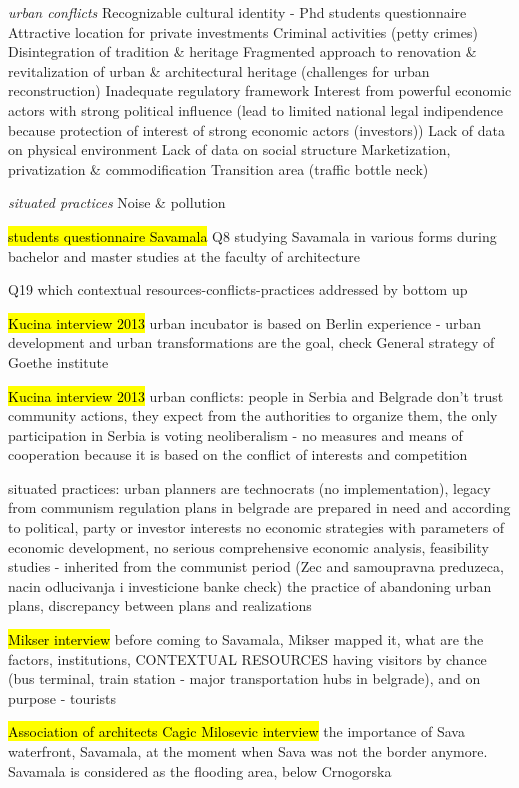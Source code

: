 \documentclass[11pt]{report}
\begin{document}
\textit{urban conflicts}
Recognizable cultural identity - Phd students questionnaire
Attractive location for private investments
Criminal activities (petty crimes)
Disintegration of tradition \& heritage
Fragmented approach to renovation \& revitalization of urban \& architectural heritage (challenges for urban reconstruction)
Inadequate regulatory framework
Interest from powerful economic actors with strong political
influence (lead to limited national legal indipendence because protection of interest of strong economic actors (investors))
Lack of data on physical environment
Lack of data on social structure
Marketization, privatization \& commodification
Transition area (traffic bottle neck)

\textit{situated practices}
Noise \& pollution

\hl{students questionnaire Savamala}
Q8
studying Savamala in various forms during bachelor and master studies at the faculty of architecture

Q19 which contextual resources-conflicts-practices addressed by bottom up

\hl{Kucina interview 2013}
urban incubator is based on Berlin experience - urban development and urban transformations are the goal, check General strategy of Goethe institute

\hl{Kucina interview 2013}
urban conflicts: 
people in Serbia and Belgrade don't trust community actions, they expect from the authorities to organize them, the only participation in Serbia is voting
neoliberalism - no measures and means of cooperation because it is based on the conflict of interests and competition

situated practices:
urban planners are technocrats (no implementation), legacy from communism
regulation plans in belgrade are prepared in need and according to political, party or investor interests
no economic strategies with parameters of economic development, no serious comprehensive economic analysis, feasibility studies - inherited from the communist period (Zec and samoupravna preduzeca, nacin odlucivanja i investicione banke check)
the practice of abandoning urban plans, discrepancy between plans and realizations

\hl{Mikser interview}
before coming to Savamala, Mikser mapped it, what are the factors, institutions, CONTEXTUAL RESOURCES
having visitors by chance (bus terminal, train station - major transportation hubs in belgrade), and on purpose - tourists

\hl{Association of architects Cagic Milosevic interview}
the importance of Sava waterfront, Savamala, at the moment when Sava was not the border anymore.
Savamala is considered as the flooding area, below Crnogorska
\end{document}

